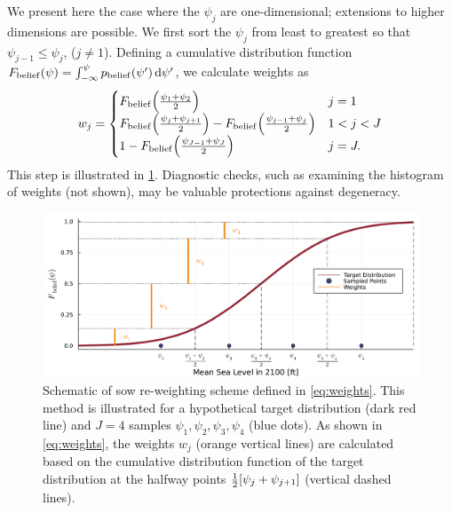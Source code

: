\documentclass{agujournal2019}
\begin{document}
We present here the case where the $\psi_j$ are one-dimensional; extensions to higher dimensions are possible.
We first sort the $\psi_j$  from least to greatest so that $\psi_{j-1} \leq \psi_j$, ($j \neq 1$).
Defining a cumulative distribution function
$F_\mathrm{belief} \qty(\psi) = \int_{-\infty}^{\psi} p_\mathrm{belief}(\psi') \dd{\psi'}$,
we calculate weights as
\begin{equation}\label{eq:weights}
  w_j = \begin{cases}
    F_\mathrm{belief}\qty(\frac{\psi_1 + \psi_2}{2})                                                              & j = 1     \\
    F_\mathrm{belief}\qty(\frac{\psi_{j} + \psi_{j+1}}{2}) - F_\mathrm{belief}\qty(\frac{\psi_{j-1} + \psi_j}{2}) & 1 < j < J \\
    1 - F_\mathrm{belief}\qty(\frac{\psi_{J-1} + \psi_J}{2})                                                      & j = J.
  \end{cases}
\end{equation}
This step is illustrated in \cref{fig:grid-sketch}.
Diagnostic checks, such as examining the histogram of weights (not shown), may be valuable protections against degeneracy.

\begin{figure}
  \centering
  \includegraphics[width=\textwidth]{grid-sketch}
  \caption{
    Schematic of \gls{sow} re-weighting scheme defined in \cref{eq:weights}.
    This method is illustrated for a hypothetical target distribution (dark red line) and $J=4$ samples $\psi_1, \psi_2, \psi_3, \psi_4$ (blue dots).
    As shown in \cref{eq:weights}, the weights $w_j$ (orange vertical lines) are calculated based on the cumulative distribution function of the target distribution at the halfway points $\frac{1}{2}\qty[\psi_j+\psi_{j+1}]$ (vertical dashed lines).
  }\label{fig:grid-sketch}
\end{figure}
\end{document}
